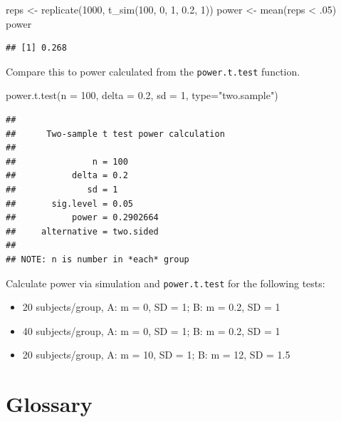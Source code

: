 \documentclass[
  oneside]{book}
\newenvironment{Shaded}{\begin{snugshade}}{\end{snugshade}}
\newcommand{\AttributeTok}[1]{\textcolor[rgb]{0.77,0.63,0.00}{#1}}
\newcommand{\DecValTok}[1]{\textcolor[rgb]{0.00,0.00,0.81}{#1}}
\newcommand{\FloatTok}[1]{\textcolor[rgb]{0.00,0.00,0.81}{#1}}
\newcommand{\FunctionTok}[1]{\textcolor[rgb]{0.00,0.00,0.00}{#1}}
\newcommand{\NormalTok}[1]{#1}
\newcommand{\OtherTok}[1]{\textcolor[rgb]{0.56,0.35,0.01}{#1}}
\newcommand{\SpecialCharTok}[1]{\textcolor[rgb]{0.00,0.00,0.00}{#1}}
\newcommand{\StringTok}[1]{\textcolor[rgb]{0.31,0.60,0.02}{#1}}
\providecommand{\tightlist}{%
  \setlength{\itemsep}{0pt}\setlength{\parskip}{0pt}}
\begin{document}
\begin{Shaded}
\begin{Highlighting}[]
\NormalTok{reps }\OtherTok{\textless{}{-}} \FunctionTok{replicate}\NormalTok{(}\DecValTok{1000}\NormalTok{, }\FunctionTok{t\_sim}\NormalTok{(}\DecValTok{100}\NormalTok{, }\DecValTok{0}\NormalTok{, }\DecValTok{1}\NormalTok{, }\FloatTok{0.2}\NormalTok{, }\DecValTok{1}\NormalTok{))}
\NormalTok{power }\OtherTok{\textless{}{-}} \FunctionTok{mean}\NormalTok{(reps }\SpecialCharTok{\textless{}}\NormalTok{ .}\DecValTok{05}\NormalTok{)}
\NormalTok{power}
\end{Highlighting}
\end{Shaded}

\begin{verbatim}
## [1] 0.268
\end{verbatim}

Compare this to power calculated from the \texttt{power.t.test} function.

\begin{Shaded}
\begin{Highlighting}[]
\FunctionTok{power.t.test}\NormalTok{(}\AttributeTok{n =} \DecValTok{100}\NormalTok{, }\AttributeTok{delta =} \FloatTok{0.2}\NormalTok{, }\AttributeTok{sd =} \DecValTok{1}\NormalTok{, }\AttributeTok{type=}\StringTok{"two.sample"}\NormalTok{)}
\end{Highlighting}
\end{Shaded}

\begin{verbatim}
## 
##      Two-sample t test power calculation 
## 
##               n = 100
##           delta = 0.2
##              sd = 1
##       sig.level = 0.05
##           power = 0.2902664
##     alternative = two.sided
## 
## NOTE: n is number in *each* group
\end{verbatim}

Calculate power via simulation and \texttt{power.t.test} for the following tests:

\begin{itemize}
\tightlist
\item
  20 subjects/group, A: m = 0, SD = 1; B: m = 0.2, SD = 1
\item
  40 subjects/group, A: m = 0, SD = 1; B: m = 0.2, SD = 1
\item
  20 subjects/group, A: m = 10, SD = 1; B: m = 12, SD = 1.5
\end{itemize}

\hypertarget{glossary-func}{%
\section{Glossary}\label{glossary-func}}
\end{document}
